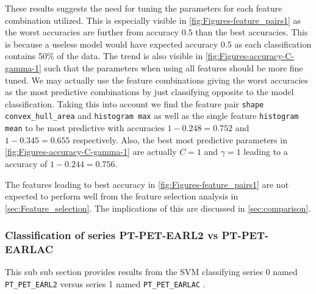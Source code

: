 These results suggests the need for tuning the parameters for each feature combination utilized. 
This is especially visible in \autoref{fig:Figures-feature_pairs1} as the worst accuracies are further from accuracy $0.5$ than 
the best accuracies. This is because a useless model would have expected accuracy $0.5$ as each classification contains 50\% of the data. 
The trend is also visible in \autoref{fig:Figures-accuracy-C-gamma-1} such that the parameters when using all features 
should be more fine tuned. We may actually use the feature combinations giving the worst accuracies as the most predictive combinations 
by just classifying opposite to the model classification. Taking this into account we find 
the feature pair \verb|shape convex_hull_area| and \verb|histogram max| as well as the single feature 
\verb|histogram mean| to be most predictive with accuracies $1-0.248=0.752$ and $1-0.345=0.655$ respectively.  
Also, the best most predictive parameters in \autoref{fig:Figures-accuracy-C-gamma-1} are actually $C=1$ and $\gamma =1$
leading to a accuracy of $1-0.244=0.756$.  

The features leading to best accuracy in \autoref{fig:Figures-feature_pairs1} are not expected to perform well from the feature selection 
analysis in \autoref{sec:Feature_selection}. The implications of this are discussed in \autoref{sec:comparison}.  





\subsubsection{Classification of series PT-PET-EARL2 vs PT-PET-EARLAC}
\label{sec:SVM2}
This sub sub section provides results from the SVM classifying series 0 named \verb|PT_PET_EARL2|
versus series 1 named \verb|PT_PET_EARLAC| . 



